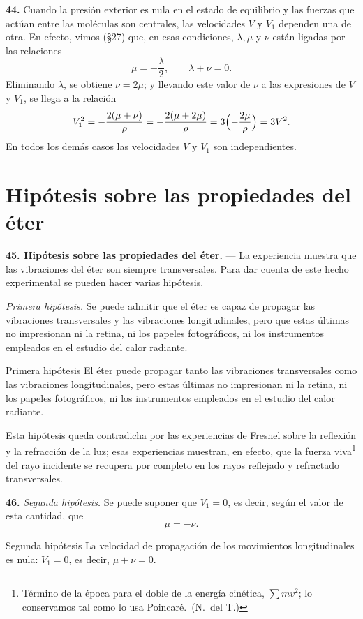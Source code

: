 \noindent\textbf{44.} Cuando la presión exterior es nula en el estado de
equilibrio y las fuerzas que actúan entre las moléculas son centrales, las
velocidades $V$ y $V_1$ dependen una de otra. En efecto, vimos (§27) que,
en esas condiciones, $\lambda,\mu$ y $\nu$ están ligadas por las
relaciones
\[
\mu=-\frac{\lambda}{2},\qquad \lambda+\nu=0.
\]
Eliminando $\lambda$, se obtiene $\nu=2\mu$; y llevando este valor de
$\nu$ a las expresiones de $V$ y $V_1$, se llega a la relación
\[
V_1^2 = -\frac{2(\mu+\nu)}{\rho} = -\frac{2(\mu+2\mu)}{\rho}
= 3\Bigl(-\frac{2\mu}{\rho}\Bigr) = 3V^2.
\]
En todos los demás casos las velocidades $V$ y $V_1$ son independientes.

\section{Hipótesis sobre las propiedades del éter}

\noindent\textbf{45. Hipótesis sobre las propiedades del éter.} — La
experiencia muestra que las vibraciones del éter son siempre
transversales. Para dar cuenta de este hecho experimental se pueden hacer
varias hipótesis.

\emph{Primera hipótesis.} Se puede admitir que el éter es capaz de
propagar las vibraciones transversales y las vibraciones longitudinales,
pero que estas últimas no impresionan ni la retina, ni los papeles
fotográficos, ni los instrumentos empleados en el estudio del calor
radiante.

\begin{enunciado}{Primera hipótesis}
El éter puede propagar tanto las vibraciones transversales como las
vibraciones longitudinales, pero estas últimas no impresionan ni la
retina, ni los papeles fotográficos, ni los instrumentos empleados en el
estudio del calor radiante.
\end{enunciado}

Esta hipótesis queda contradicha por las experiencias de Fresnel sobre la
reflexión y la refracción de la luz; esas experiencias muestran, en
efecto, que la fuerza viva\footnote{Término de la época para el doble de
la energía cinética, $\sum m v^2$; lo conservamos tal como lo usa
Poincaré.~(N.~del T.)} del rayo incidente se recupera por completo en los rayos
reflejado y refractado transversales.

\noindent\textbf{46.} \emph{Segunda hipótesis.} Se puede suponer que
$V_1=0$, es decir, según el valor de esta cantidad, que
\[
\mu=-\nu.
\]

\begin{enunciado}{Segunda hipótesis}
La velocidad de propagación de los movimientos longitudinales es nula:
$V_1=0$, es decir, $\mu+\nu=0$.
\end{enunciado}

